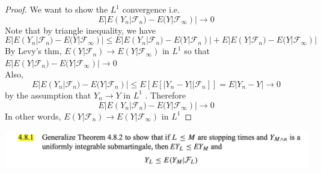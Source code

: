 \documentclass[12pt, A4]{article}
\newcommand{\F}{\mathcal{F}}
\begin{document}
\begin{proof}
    We want to show the $L^1$ convergence i.e. $$E|E(Y_n |\F_n) - E(Y |\F_\infty) |\rightarrow 0 $$
    Note that by triangle inequality, we have
    $$E|E(Y_n |\F_n) - E(Y |\F_\infty) | \leq E|E(Y_n|\F_n)-E(Y|\F_n)| + E|E(Y|\F_n) - E(Y|\F_\infty)| $$
    By Levy's thm, $E(Y|\F_n) \rightarrow E(Y|\F_\infty)$ in $L^1$ so that $E|E(Y|\F_n) - E(Y|\F_\infty)|\rightarrow 0 $ \\
    Also, $$E|E(Y_n|\F_n)-E(Y|\F_n)| \leq E[E[|Y_n-Y| \big| \F_n]]= E|Y_n-Y|\rightarrow 0 $$ by the assumption that $Y_n \rightarrow Y$ in $L^1$ . Therefore $$ E|E(Y_n |\F_n) - E(Y |\F_\infty) | \rightarrow 0$$ In other words, $E(Y|\F_n)\rightarrow E(Y|\F_\infty)$ in $L^1$
\end{proof}

\vspace{1cm}

\includegraphics[width=17cm]{Exer4.8.1.png}
\end{document}
